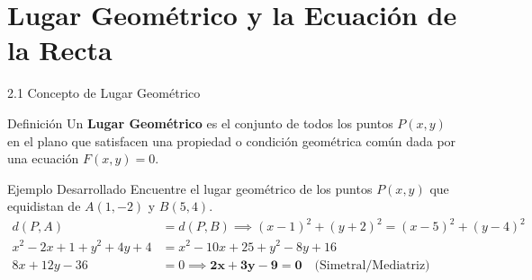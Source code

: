 \documentclass[10pt,aspectratio=169,spanish]{beamer}
\begin{document}
\section{Lugar Geométrico y la Ecuación de la Recta}

\begin{frame}{2.1 Concepto de Lugar Geométrico}
\begin{block}{Definición}
Un \textbf{Lugar Geométrico} es el conjunto de todos los puntos $P(x,y)$ en el plano que satisfacen una propiedad o condición geométrica común dada por una ecuación $F(x,y)=0$.
\end{block}

\begin{exampleblock}{Ejemplo Desarrollado}
Encuentre el lugar geométrico de los puntos $P(x,y)$ que equidistan de $A(1,-2)$ y $B(5,4)$.
\pause
\begin{align*}
  d(P,A) &= d(P,B) \implies (x-1)^2 + (y+2)^2 = (x-5)^2 + (y-4)^2 \\
  x^2 - 2x + 1 + y^2 + 4y + 4 &= x^2 - 10x + 25 + y^2 - 8y + 16 \\
  8x + 12y - 36 &= 0 \implies \mathbf{2x + 3y - 9 = 0} \quad \text{(Simetral/Mediatriz)}
\end{align*}
\end{exampleblock}
\end{frame}
\end{document}
